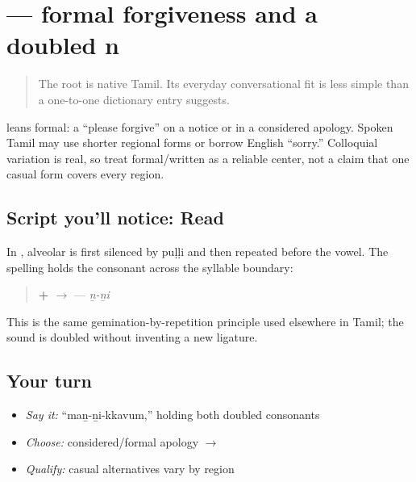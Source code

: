\section[\texorpdfstring{\ta{மன்னிக்கவும்} / sorry (maṉṉikkavum / sorry)}{மன்னிக்கவும் / sorry (maṉṉikkavum / sorry)}]{ — formal forgiveness and a doubled n}

\label{lesson:TA-C09-sorry-register}



\begin{quote}
The root is native Tamil. Its everyday conversational fit is less simple than a one-to-one dictionary entry suggests.
\end{quote}

\begin{culture}
\textbf{} leans formal: a \textquotedblleft{}please forgive\textquotedblright{} on a notice or in a considered apology. Spoken Tamil may use shorter regional forms or borrow English \textquotedblleft{}sorry.\textquotedblright{} Colloquial variation is real, so treat formal/written as a reliable center, not a claim that one casual form covers every region.
\end{culture}

\subsection*{Script you'll notice: Read }
In \textbf{}, alveolar \textbf{} is first silenced by puḷḷi and then repeated before the vowel. The spelling holds the consonant across the syllable boundary:

\begin{quote}
\textbf{ +  $\to$ } — \emph{ṉ-ṉi}
\end{quote}

This is the same gemination-by-repetition principle used elsewhere in Tamil; the sound is doubled without inventing a new ligature.

\subsection*{Your turn}
\begin{itemize}
\raggedright
  \item \emph{Say it:} \textquotedblleft{}maṉ-ṉi-kkavum,\textquotedblright{} holding both doubled consonants
  \item \emph{Choose:} considered/formal apology $\to$ \textbf{}
  \item \emph{Qualify:} casual alternatives vary by region
\end{itemize}


